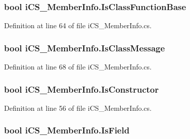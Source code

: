 \hypertarget{classi_c_s___member_info_af559152dcda6cb84e8f25d437a12a0d5}{
\subsubsection[{Is\+Class\+Function\+Base}]{\setlength{\rightskip}{0pt plus 5cm}bool i\+C\+S\+\_\+\+Member\+Info.\+Is\+Class\+Function\+Base\hspace{0.3cm}{\ttfamily [get]}}}\label{classi_c_s___member_info_af559152dcda6cb84e8f25d437a12a0d5}


Definition at line 64 of file i\+C\+S\+\_\+\+Member\+Info.\+cs.

\hypertarget{classi_c_s___member_info_a5941c1d71b216e7483aae4cec77d39e8}{
\subsubsection[{Is\+Class\+Message}]{\setlength{\rightskip}{0pt plus 5cm}bool i\+C\+S\+\_\+\+Member\+Info.\+Is\+Class\+Message\hspace{0.3cm}{\ttfamily [get]}}}\label{classi_c_s___member_info_a5941c1d71b216e7483aae4cec77d39e8}


Definition at line 68 of file i\+C\+S\+\_\+\+Member\+Info.\+cs.

\hypertarget{classi_c_s___member_info_aea0dcf332478f47851ba686c75324859}{
\subsubsection[{Is\+Constructor}]{\setlength{\rightskip}{0pt plus 5cm}bool i\+C\+S\+\_\+\+Member\+Info.\+Is\+Constructor\hspace{0.3cm}{\ttfamily [get]}}}\label{classi_c_s___member_info_aea0dcf332478f47851ba686c75324859}


Definition at line 56 of file i\+C\+S\+\_\+\+Member\+Info.\+cs.

\hypertarget{classi_c_s___member_info_ad4c448f2fa0380976235299cb14354ff}{
\subsubsection[{Is\+Field}]{\setlength{\rightskip}{0pt plus 5cm}bool i\+C\+S\+\_\+\+Member\+Info.\+Is\+Field\hspace{0.3cm}{\ttfamily [get]}}}\label{classi_c_s___member_info_ad4c448f2fa0380976235299cb14354ff}


